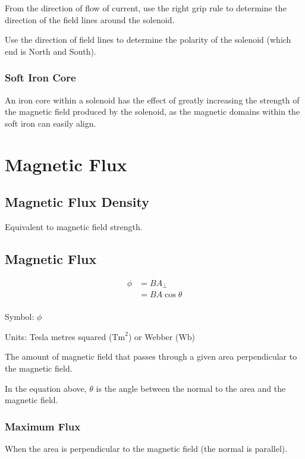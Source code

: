\documentclass[a4paper,11pt]{report}
\begin{document}
From the direction of flow of current, use the right grip rule to determine the
direction of the field lines around the solenoid.

Use the direction of field lines to determine the polarity of the solenoid
(which end is North and South).

\subsubsection{Soft Iron Core}

An iron core within a solenoid has the effect of greatly increasing the
strength of the magnetic field produced by the solenoid, as the magnetic
domains within the soft iron can easily align.


\section{Magnetic Flux}

\subsection{Magnetic Flux Density}

Equivalent to magnetic field strength.

\subsection{Magnetic Flux}

$$
\begin{aligned}
\phi & = BA_{\bot} \\
& = BA \cos{\theta} \\
\end{aligned}
$$

Symbol: $\phi$

Units: Tesla metres squared ($\text{Tm}^2$) or Webber ($\text{Wb}$)

The amount of magnetic field that passes through a given area perpendicular to
the magnetic field.

In the equation above, $\theta$ is the angle between the normal to the area
and the magnetic field.

\subsubsection{Maximum Flux}

When the area is perpendicular to the magnetic field (the normal is parallel).
\end{document}
